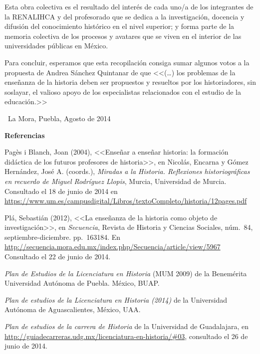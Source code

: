 Esta obra colectiva es el resultado del interés de cada uno\slash{}a de los
integrantes de la RENALIHCA y del profesorado que se dedica a la
investigación, docencia y difusión del conocimiento histórico en el nivel
superior; y forma parte de la memoria colectiva de los procesos y avatares 
que se viven en el interior de las universidades públicas en México.

\enlargethispage{1\baselineskip}
Para concluir, esperamos que esta recopilación consiga sumar algunos votos 
a la propuesta de Andrea Sánchez Quintanar de que <<(\ldots) los problemas de la enseñanza de la historia deben ser propuestos y resueltos por los historiadores, sin soslayar, el valioso apoyo de los especialistas 
relacionados con el estudio de la educación.>> 

\bigskip
{\raggedleft\ La Mora, Puebla, Agosto de 2014\par}
\newpage

{\bfseries Referencias}

\medskip
Pagès i Blanch, Joan (2004), <<Enseñar a enseñar historia: la formación
didáctica de los futuros profesores de historia>>, en Nicolás, Encarna y
Gómez Hernández, José A. (coords.), \textit{Miradas a la Historia.
Reflexiones historiográficas en recuerdo de Miguel Rodríguez  Llopis},
Murcia, Universidad de Murcia. Consultado el 18 de junio de 2014 en 
\url{https://www.um.es/campusdigital/Libros/textoCompleto/historia/12pages.pdf}

\begin{sloppypar}
Plá, Sebastián (2012), <<La enseñanza de la historia como objeto de
investigación>>, en \textit{Secuencia}, Revista de Historia y Ciencias
Sociales, núm.\ 84, septiembre-diciembre. pp.\ 163\textendash{}184. En
\url{http://secuencia.mora.edu.mx/index.php/Secuencia/article/view/5967}
Consultado el 22 de junio de 2014.
\end{sloppypar}

\textit{Plan de Estudios de la Licenciatura en Historia} (MUM 2009) de la
Benemérita Universidad Autónoma de Puebla. México, BUAP.

\textit{Plan de estudios de la Licenciatura en Historia (2014)} de la
Universidad Autónoma de Aguascalientes, México, UAA\@.

\begin{sloppypar}
\textit{Plan de estudios de la carrera de Historia} de la Universidad de
Guadalajara, en
\url{http://guiadecarreras.udg.mx/licenciatura-en-historia/#03}, consultado
el 26 de junio de 2014.
\end{sloppypar}

